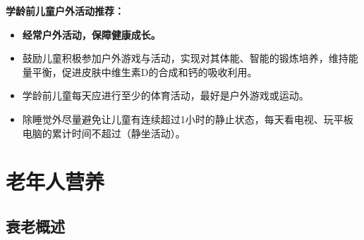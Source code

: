 \begin{keybox}
\textbf{学龄前儿童户外活动推荐：}
\begin{itemize}[leftmargin=*]
    \item \textbf{经常户外活动，保障健康成长。}
    \item 鼓励儿童积极参加户外游戏与活动，实现对其体能、智能的锻炼培养，维持能量平衡，促进皮肤中维生素D的合成和钙的吸收利用。
    \item 学龄前儿童每天应进行至少的体育活动，最好是户外游戏或运动。
    \item 除睡觉外尽量避免让儿童有连续超过1小时的静止状态，每天看电视、玩平板电脑的累计时间不超过（静坐活动）。
\end{itemize}
\end{keybox}

\section{老年人营养}

\subsection{衰老概述}

